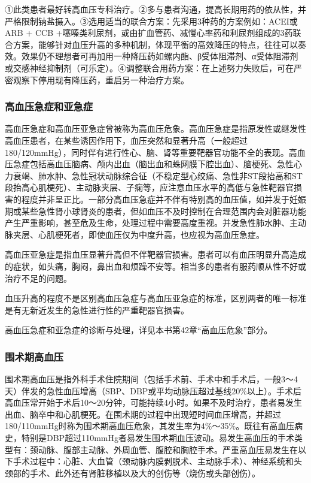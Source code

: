 ①此类患者最好转高血压专科治疗。②多与患者沟通，提高长期用药的依从性，并严格限制钠盐摄入。③选用适当的联合方案：先采用3种药的方案例如：ACEI或ARB
+ CCB
+噻嗪类利尿剂，或由扩血管药、减慢心率药和利尿剂组成的3药联合方案，能够针对血压升高的多种机制，体现平衡的高效降压的特点，往往可以奏效。效果仍不理想者可再加用一种降压药如螺内酯、β受体阻滞剂、α受体阻滞剂或交感神经抑制剂（可乐定）。④调整联合用药方案：在上述努力失败后，可在严密观察下停用现有降压药，重启另一种治疗方案。

\subsubsection{高血压急症和亚急症}

高血压急症和高血压亚急症曾被称为高血压危象。高血压急症是指原发性或继发性高血压患者，在某些诱因作用下，血压突然和显著升高（一般超过180/120mmHg），同时伴有进行性心、脑、肾等重要靶器官功能不全的表现。高血压急症包括高血压脑病、颅内出血（脑出血和蛛网膜下腔出血）、脑梗死、急性心力衰竭、肺水肿、急性冠状动脉综合征（不稳定型心绞痛、急性非ST段抬高和ST段抬高心肌梗死）、主动脉夹层、子痫等，应注意血压水平的高低与急性靶器官损害的程度并非呈正比。一部分高血压急症并不伴有特别高的血压值，如并发于妊娠期或某些急性肾小球肾炎的患者，但如血压不及时控制在合理范围内会对脏器功能产生严重影响，甚至危及生命，处理过程中需要高度重视。并发急性肺水肿、主动脉夹层、心肌梗死者，即使血压仅为中度升高，也应视为高血压急症。

高血压亚急症是指血压显著升高但不伴靶器官损害。患者可以有血压明显升高造成的症状，如头痛，胸闷，鼻出血和烦躁不安等。相当多的患者有服药顺从性不好或治疗不足的问题。

血压升高的程度不是区别高血压急症与高血压亚急症的标准，区别两者的唯一标准是有无新近发生的急性进行性的严重靶器官损害。

高血压急症和亚急症的诊断与处理，详见本书第42章“高血压危象”部分。

\subsubsection{围术期高血压}

围术期高血压是指外科手术住院期间（包括手术前、手术中和手术后，一般3～4天）伴发的急性血压增高（SBP、DBP或平均动脉压超过基线20\%以上）。手术后高血压常开始于术后10～20分钟，可能持续4小时。如果不及时治疗，患者易发生出血、脑卒中和心肌梗死。在围术期的过程中出现短时间血压增高，并超过180/110mmHg时称为围术期高血压危象，其发生率为4\%～35\%。既往有高血压病史，特别是DBP超过110mmHg者易发生围术期血压波动。易发生高血压的手术类型有：颈动脉、腹部主动脉、外周血管、腹腔和胸腔手术。严重高血压易发生在以下手术过程中：心脏、大血管（颈动脉内膜剥脱术、主动脉手术）、神经系统和头颈部的手术、此外还有肾脏移植以及大的创伤等（烧伤或头部创伤）。

